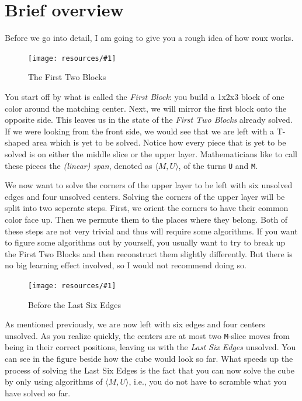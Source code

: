 \documentclass[a4paper]{scrreprt}
\newcommand{\img}[3]{
	\begin{figure}[ht]
	\centering
  \texttt{[image: resources/\#1]}
	\caption{#3}
	\end{figure}
}
\begin{document}
\section{Brief overview}

Before we go into detail, I am going to give you a rough idea of how roux works.\par

\img{f2b_transparent.png}{0.3}{The First Two Blocks}

You start off by what is called the \emph{First Block}: you build a 1x2x3 block of one color around the matching center. Next, we will mirror the first block onto the opposite side. This leaves us in the state of the \emph{First Two Blocks} already solved. If we were looking from the front side, we would see that we are left with a T-shaped area which is yet to be solved. Notice how every piece that is yet to be solved is on either the middle slice or the upper layer. Mathematicians like to call these pieces the \emph{(linear) span}, denoted as $\langle M, U \rangle$, of the turns \texttt{U} and \texttt{M}.\par

We now want to solve the corners of the upper layer to be left with six unsolved edges and four unsolved centers. Solving the corners of the upper layer will be split into two seperate steps. First, we orient the corners to have their common color face up. Then we permute them to the places where they belong. Both of these steps are not very trivial and thus will require some algorithms. If you want to figure some algorithms out by yourself, you usually want to try to break up the First Two Blocks and then reconstruct them slightly differently. But there is no big learning effect involved, so I would not recommend doing so.\par

\img{lse.png}{0.3}{Before the Last Six Edges}

As mentioned previously, we are now left with six edges and four centers unsolved. As you realize quickly, the centers are at most two \texttt{M}-slice moves from being in their correct positions, leaving us with the \emph{Last Six Edges} unsolved. You can see in the figure beside how the cube would look so far. What speeds up the process of solving the Last Six Edges is the fact that you can now solve the cube by only using algorithms of $\langle M, U\rangle$, i.e., you do not have to scramble what you have solved so far.\par
\end{document}
